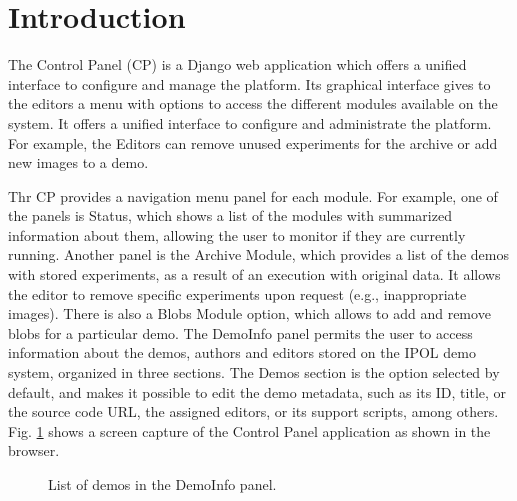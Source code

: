\section{Introduction}
The Control Panel (CP) is a Django web application which offers a unified interface to configure and manage the platform. Its graphical interface gives to the editors a menu with options to access the different modules available on the system. It offers a unified interface to configure and administrate the platform. For example, the Editors can remove unused experiments for the archive or add new images to a demo.

Thr CP provides a navigation menu panel for each module. For example, one of the panels is Status, which shows a list of the modules with summarized information about them, allowing the user to monitor if they are currently running. Another panel is the Archive Module, which provides a list of the demos with stored experiments, as a result of an execution with original data. It allows the editor to remove specific experiments upon request (e.g., inappropriate images). There is also a Blobs Module option, which allows to add and remove blobs for a particular demo. The DemoInfo panel permits the user to access information about the demos, authors and editors stored on the IPOL demo system, organized in three sections.
%
The Demos section is the option selected by default, and makes it possible to edit the demo metadata, such as its ID, title, or the source code URL, the assigned editors, or its support scripts, among others. Fig. \ref{fig:control_panel} shows a screen capture of the Control Panel application as shown in the browser.

\begin{figure}[!ht]
    \centering
    \caption{List of demos in the DemoInfo panel.}
    \label{fig:control_panel}
\end{figure}
